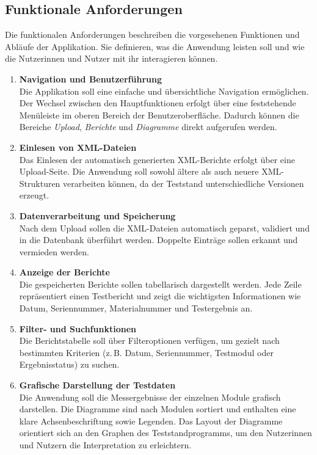 \subsection{Funktionale Anforderungen}\label{subsec:funktionale-anforderungen}

Die funktionalen Anforderungen beschreiben die vorgesehenen Funktionen und Abläufe der Applikation.
Sie definieren, was die Anwendung leisten soll und wie die Nutzerinnen und Nutzer mit ihr interagieren können.

\begin{enumerate}
  \item \textbf{Navigation und Benutzerführung} \\
  Die Applikation soll eine einfache und übersichtliche Navigation ermöglichen.
  Der Wechsel zwischen den Hauptfunktionen erfolgt über eine feststehende Menüleiste im oberen Bereich der Benutzeroberfläche.
  Dadurch können die Bereiche \textit{Upload}, \textit{Berichte} und \textit{Diagramme} direkt aufgerufen werden.

  \item \textbf{Einlesen von XML-Dateien} \\
  Das Einlesen der automatisch generierten XML-Berichte erfolgt über eine Upload-Seite.
  Die Anwendung soll sowohl ältere als auch neuere XML-Strukturen verarbeiten können, da der Teststand unterschiedliche Versionen erzeugt.

  \item \textbf{Datenverarbeitung und Speicherung} \\
  Nach dem Upload sollen die XML-Dateien automatisch geparst, validiert und in die Datenbank überführt werden.
  Doppelte Einträge sollen erkannt und vermieden werden.

  \item \textbf{Anzeige der Berichte} \\
  Die gespeicherten Berichte sollen tabellarisch dargestellt werden.
  Jede Zeile repräsentiert einen Testbericht und zeigt die wichtigsten Informationen wie Datum, Seriennummer, Materialnummer und Testergebnis an.

  \item \textbf{Filter- und Suchfunktionen} \\
  Die Berichtstabelle soll über Filteroptionen verfügen, um gezielt nach bestimmten Kriterien
  (z.\,B. Datum, Seriennummer, Testmodul oder Ergebnisstatus) zu suchen.

  \item \textbf{Grafische Darstellung der Testdaten} \\
  Die Anwendung soll die Messergebnisse der einzelnen Module grafisch darstellen.
  Die Diagramme sind nach Modulen sortiert und enthalten eine klare Achsenbeschriftung sowie Legenden.
  Das Layout der Diagramme orientiert sich an den Graphen des Teststandprogramms, um den Nutzerinnen und Nutzern die Interpretation zu erleichtern.


\end{enumerate}
